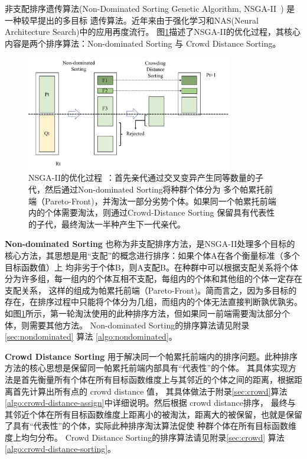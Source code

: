 非支配排序遗传算法(Non-Dominated Sorting Genetic Algorithm, NSGA-II~\cite{deb2002fast}) 是一种较早提出的多目标
遗传算法。近年来由于强化学习\cite{li2019deep}和NAS(Neural Architecture Search)\cite{lu2019nsga}中的应用再度流行。
图\ref{fig:NSGA-II}描述了NSGA-II的优化过程，其核心内容是两个排序算法：Non-dominated Sorting 与 Crowd Distance Sorting。

\begin{figure}[h]
	\centering
	\includegraphics[width=0.8\textwidth]{figure/NSGA-II}
	\caption{NSGA-II的优化过程~\cite{deb2002fast}：首先亲代通过交叉变异产生同等数量的子代，然后通过Non-dominated Sorting将种群个体分为
	多个帕累托前端（Pareto-Front)，并淘汰一部分劣势个体。如果同一个帕累托前端内的个体需要淘汰，则通过Crowd-Distance Sorting
	保留具有代表性的子代，最终淘汰一半种产生下一代亲代。} 
	\label{fig:NSGA-II}
\end{figure}

{\bf Non-dominated Sorting}
也称为非支配排序方法，是NSGA-II处理多个目标的核心方法，其思想是用“支配”的概念进行排序：如果个体A在各个衡量标准（多个目标函数值）上
均非劣于个体B，则A支配B。在种群中可以根据支配关系将个体分为许多组，每一组内的个体互相不支配，每组内的个体和其他组的个体一定存在支配关系，
这样的组成为帕累托前端（Pareto-Front)。简而言之，因为多目标的存在，在排序过程中只能将个体分为几组，而组内的个体无法直接判断孰优孰劣。
如图\ref{fig:NSGA-II}所示，第一轮淘汰使用的此种排序方法，但如果同一前端需要淘汰部分个体，则需要其他方法。
Non-dominated Sorting的排序算法请见附录\ref{sec:nondominated} 算法 \ref{algo:nondominated}。


{\bf Crowd Distance Sorting}
用于解决同一个帕累托前端内的排序问题。此种排序方法的核心思想是保留同一帕累托前端内部具有“代表性”的个体。
其具体实现方法是首先衡量所有个体在所有目标函数维度上与其邻近的个体之间的距离，根据距离首先计算出所有点的 crowd distance 值，
其具体做法于附录\ref{sec:crowd}算法 \ref{algo:crowd-distance-assign}中详细说明。然后根据 crowd distance排序，
最终与其邻近个体在所有目标函数维度上距离小的被淘汰，距离大的被保留，也就是保留了具有“代表性”的个体，实际此种排序淘汰算法促使
种群个体在所有目标函数维度上均匀分布。
Crowd Distance Sorting的排序算法请见附录\ref{sec:crowd} 算法 \ref{algo:crowd-distance-sorting}。



